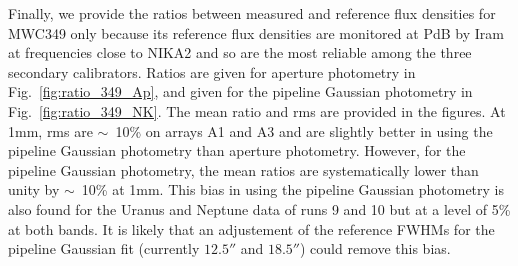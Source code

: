 Finally, we provide the ratios between measured and reference flux densities for MWC349 only because
its reference flux densities are monitored at PdB
       by Iram at frequencies close to NIKA2 and so are the most reliable among the three secondary calibrators.
       Ratios are given for aperture photometry in Fig.~\ref{fig:ratio_349_Ap}, and  given for
       the pipeline Gaussian photometry in Fig.~\ref{fig:ratio_349_NK}.
       The mean ratio and rms are provided in the figures. At 1mm, rms  are $\sim$~10\% on arrays A1 and A3 
       and are slightly better
       in using the pipeline Gaussian photometry than aperture photometry.
       However, for the  pipeline Gaussian photometry, the mean ratios are systematically lower than unity by $\sim$~10\% at 1mm.
        This bias in using the pipeline Gaussian photometry
       is also found for the Uranus and Neptune data of runs 9 and 10 but at a level of 5\% at both bands. It is likely that an adjustement
       of the reference FWHMs for the pipeline Gaussian fit (currently $12.5''$ and $18.5''$) could remove this bias.








